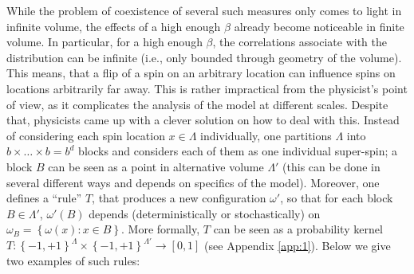 \documentclass[12pt]{article}
\newcommand{\set}[1]{\left\{#1\right\}}
\newcommand{\ra}{\rightarrow}
\newcommand{\1}{\mathbbm{1}}
\newcommand{\5}{\vspace{0.5cm}}
\theoremstyle{definition}
\begin{document}
While the problem of coexistence of several such measures only comes to light in infinite volume, the effects of a high enough $\beta$ already become noticeable in finite volume. In particular, for a high enough $\beta$, the correlations associate with the distribution can be infinite (i.e., only bounded through geometry of the volume). This means, that a flip of a spin on an arbitrary location can influence spins on locations arbitrarily far away. This is rather impractical from the physicist's point of view, as it complicates the analysis of the model at different scales. Despite that, physicists came up with a clever solution on how to deal with this. Instead of considering each spin location $x\in\Lambda$ individually, one partitions $\Lambda$ into $b\times\ldots\times b=b^d$ blocks and considers each of them as one individual super-spin; a block $B$ can be seen as a point in alternative volume $\Lambda'$ (this can be done in several different ways and depends on specifics of the model). Moreover, one defines a ``rule'' $T$, that produces a new configuration $\omega'$, so that for each block $B\in\Lambda'$, $\omega'(B)$ depends (deterministically or stochastically) on $\omega_B=\set{\omega(x):x\in B}$. More formally, $T$ can be seen as a probability kernel $T:\set{-1,+1}^{\Lambda}\times\set{-1,+1}^{\Lambda'}\ra[0,1]$ (see Appendix \ref{app:1}). Below we give two examples of such rules:
\end{document}
